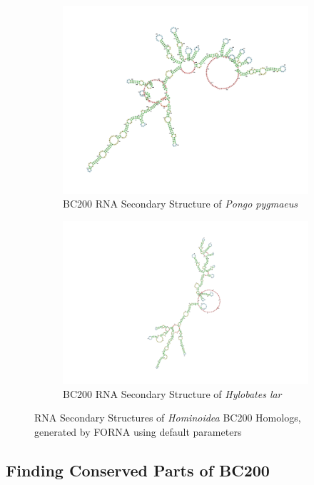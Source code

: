 \documentclass[conference, 11pt]{IEEEtran}
\begin{document}
\begin{figure}[!h]
\begin{subfigure}[b]{0.4\textwidth}
    \includegraphics[width=\textwidth]{figs/rnapongo.png}
    \caption{BC200 RNA Secondary Structure of \emph{Pongo pygmaeus}}
    \label{fig:pongo-structure}
  \end{subfigure}
  \hfill
  \begin{subfigure}[b]{0.5\textwidth}   
    \centering
    \includegraphics[width=\textwidth]{figs/rnahylobates.png}
    \caption{BC200 RNA Secondary Structure of \emph{Hylobates lar}}
    \label{fig:hylobates-structure}
  \end{subfigure}
  \caption{RNA Secondary Structures of \emph{Hominoidea} BC200 Homologs, generated by FORNA \cite{kerpedjiev2015forna} using default parameters}
  \label{fig:rna-sec-structure}
\end{figure}

\subsection{Finding Conserved Parts of BC200}
\end{document}
